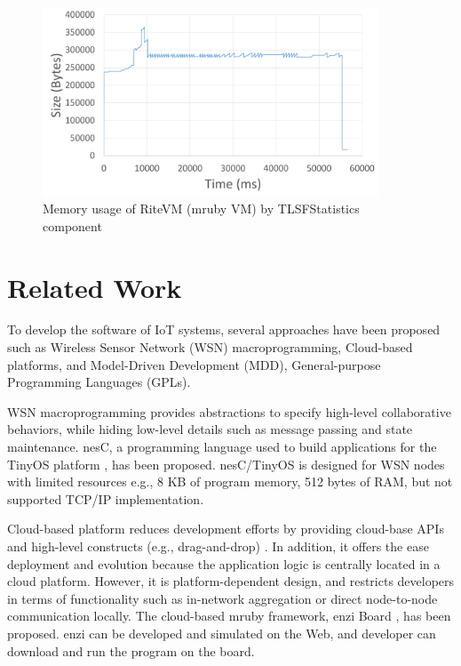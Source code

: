\documentclass[a4j,12pt,oneside,openany,english]{jsbook}
\begin{document}
\begin{figure}[t]
    \centering
    \includegraphics[width=10cm,clip]{figure/EvaluationOfTLSFStatistics.pdf}
    \caption{Memory usage of RiteVM (mruby VM) by TLSFStatistics component}
    \label{fig:EvaluationOfTLSFStatistics}
\end{figure}

\chapter{Related Work}
\label{sec:Related Work}

To develop the software of IoT systems, several approaches have been proposed \cite{par:frameworkCPS} such as Wireless Sensor Network (WSN) macroprogramming, Cloud-based platforms, and Model-Driven Development (MDD), General-purpose Programming Languages (GPLs).

WSN macroprogramming provides abstractions to specify high-level collaborative behaviors, while hiding low-level details such as message passing and state maintenance.
nesC, a programming language used to build applications for the TinyOS platform \cite{par:nesc}, has been proposed.
nesC/TinyOS is designed for WSN nodes with limited resources e.g., 8 KB of program memory, 512 bytes of RAM, but not supported TCP/IP implementation.

Cloud-based platform reduces development efforts by providing cloud-base APIs and high-level constructs (e.g., drag-and-drop) \cite{par:cloud-based}.
In addition, it offers the ease deployment and evolution because the application logic is centrally located in a cloud platform.
However, it is platform-dependent design, and restricts developers in terms of functionality such as in-network aggregation or direct node-to-node communication locally.
The cloud-based mruby framework, enzi Board \cite{url:enzi}, has been proposed.
enzi can be developed and simulated on the Web, and developer can download and run the program on the board.
\end{document}
